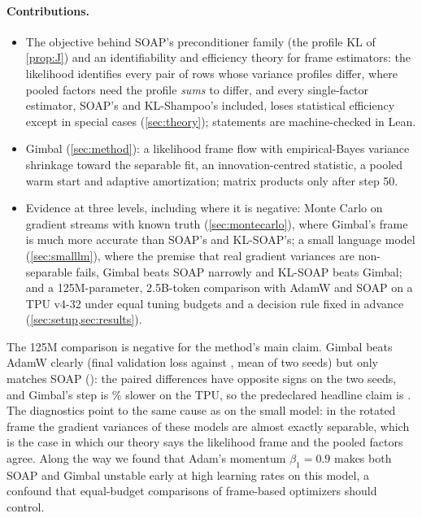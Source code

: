 \paragraph{Contributions.}
\begin{itemize}[nosep,leftmargin=1.2em]
\item The objective behind SOAP's preconditioner family (the profile KL of
\cref{prop:J}) and an identifiability and efficiency theory for frame estimators: the likelihood
identifies every pair of rows whose variance profiles differ, where pooled factors need the profile
\emph{sums} to differ, and every single-factor estimator, SOAP's and KL-Shampoo's included, loses
statistical efficiency except in special cases (\cref{sec:theory}); \LeanCount{} statements are
machine-checked in Lean.
\item Gimbal (\cref{sec:method}): a likelihood frame flow with empirical-Bayes variance shrinkage
toward the separable fit, an innovation-centred statistic, a pooled warm start and adaptive
amortization; matrix products only after step 50.
\item Evidence at three levels, including where it is negative: Monte Carlo on gradient streams
with known truth (\cref{sec:montecarlo}), where Gimbal's frame is much more accurate than SOAP's
and KL-SOAP's; a small language model (\cref{sec:smalllm}), where the premise that real gradient
variances are non-separable fails, Gimbal beats SOAP narrowly and KL-SOAP beats Gimbal; and a
125M-parameter, 2.5B-token comparison with AdamW and SOAP on a TPU v4-32 under equal tuning
budgets and a decision rule fixed in advance (\cref{sec:setup,sec:results}).
\end{itemize}

The 125M comparison is negative for the method's main claim. Gimbal beats AdamW clearly (final
validation loss \ValGimbal{} against \ValAdamw{}, mean of two seeds) but only matches SOAP
(\ValSoap{}): the paired differences have opposite signs on the two seeds, and Gimbal's step is
\MainStepGimbalOverSoap\% slower on the TPU, so the predeclared headline claim is \Headline. The
diagnostics point to the same cause as on the small model: in the rotated frame the gradient
variances of these models are almost exactly separable, which is the case in which our theory
says the likelihood frame and the pooled factors agree. Along the way we found that Adam's
momentum $\beta_1=0.9$ makes both SOAP and Gimbal unstable early at high learning rates on this
model, a confound that equal-budget comparisons of frame-based optimizers should control.
